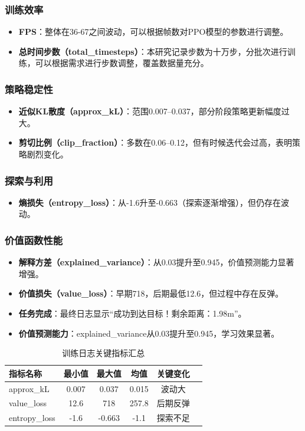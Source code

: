 \subsubsection{训练效率}
\begin{itemize}
    \item \textbf{FPS}：整体在36-67之间波动，可以根据帧数对PPO模型的参数进行调整。
    \item \textbf{总时间步数（total\_timesteps）}：本研究记录步数为十万步，分批次进行训练，可以根据需求进行步数调整，覆盖数据量充分。
\end{itemize}

\subsubsection{策略稳定性}
\begin{itemize}
    \item \textbf{近似KL散度（approx\_kL）}：范围0.007--0.037，部分阶段策略更新幅度过大。
    \item \textbf{剪切比例（clip\_fraction）}：多数在0.06--0.12，但有时候迭代会过高，表明策略剧烈变化。
\end{itemize}

\subsubsection{探索与利用}
\begin{itemize}
    \item \textbf{熵损失（entropy\_loss）}：从-1.6升至-0.663（探索逐渐增强），但仍存在波动。
\end{itemize}

\subsubsection{价值函数性能}
\begin{itemize}
    \item \textbf{解释方差（explained\_variance）}：从0.03提升至0.945，价值预测能力显著增强。
    \item \textbf{价值损失（value\_loss）}：早期718，后期最低12.6，但过程中存在反弹。
    \item \textbf{任务完成}：最终日志显示“成功到达目标！剩余距离：1.98m”。
    \item \textbf{价值预测能力}：explained\_variance从0.03提升至0.945，学习效果显著。
\end{itemize}

\begin{table}[H]
    \centering
    \caption{训练日志关键指标汇总}
    \label{tab:metrics}
    \begin{tabular}{lccccc}
        \toprule
        指标名称 & 最小值 & 最大值 & 均值 & 关键变化  \\
        \midrule
        approx\_kL & 0.007 & 0.037 & 0.015 & 波动大  \\
        value\_loss & 12.6 & 718 & 257.8 & 后期反弹  \\
        entropy\_loss & -1.6 & -0.663 & -1.1 & 探索不足  \\
        \bottomrule
    \end{tabular}
\end{table}

